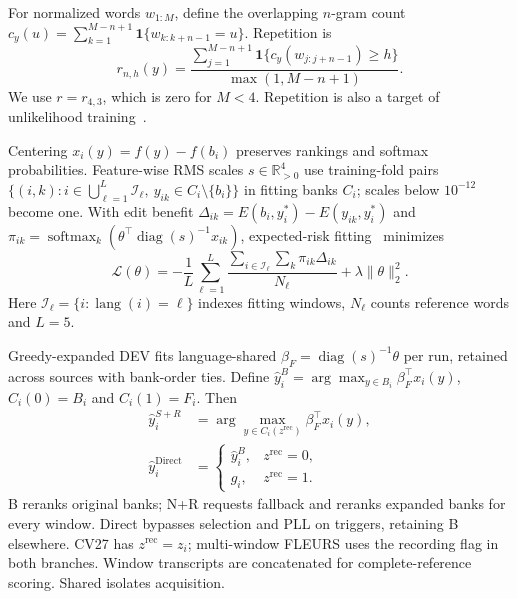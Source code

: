 \documentclass[conference,letterpaper]{IEEEtran}
\begin{document}
For normalized words $w_{1:M}$, define the overlapping $n$-gram count $c_y(u)=\sum_{k=1}^{M-n+1}\mathbf1\{w_{k:k+n-1}=u\}$. Repetition is
\begin{equation}
r_{n,h}(y)=\frac{\sum_{j=1}^{M-n+1}\mathbf1\{c_y(w_{j:j+n-1})\ge h\}}{\max(1,M-n+1)}.
\label{eq:repetition}
\end{equation}
We use $r=r_{4,3}$, which is zero for $M<4$. Repetition is also a target of unlikelihood training~\cite{welleck2020}.

Centering $x_i(y)=f(y)-f(b_i)$ preserves rankings and softmax probabilities. Feature-wise RMS scales $s\in\mathbb R^4_{>0}$ use training-fold pairs $\{(i,k):i\in\bigcup_{\ell=1}^L\mathcal I_\ell,\ y_{ik}\in C_i\setminus\{b_i\}\}$ in fitting banks $C_i$; scales below $10^{-12}$ become one. With edit benefit $\Delta_{ik}=E(b_i,y_i^*)-E(y_{ik},y_i^*)$ and $\pi_{ik}=\operatorname{softmax}_k\!\left(\theta^\top\operatorname{diag}(s)^{-1}x_{ik}\right)$, expected-risk fitting~\cite{mwer2018} minimizes
\begin{equation}
\mathcal L(\theta)=-\frac1L\sum_{\ell=1}^L\frac{\sum_{i\in\mathcal I_\ell}\sum_k\pi_{ik}\Delta_{ik}}{N_\ell}+\lambda\|\theta\|_2^2.
\label{eq:risk}
\end{equation}
Here $\mathcal I_\ell=\{i:\operatorname{lang}(i)=\ell\}$ indexes fitting windows, $N_\ell$ counts reference words and $L=5$.
\par\newpage\setlength{\parskip}{0pt plus 4pt}\noindent
Greedy-expanded DEV fits language-shared $\beta_F=\operatorname{diag}(s)^{-1}\theta$ per run, retained across sources with bank-order ties. Define $\hat{y}_i^B=\arg\max_{y\in B_i}\beta_F^\top x_i(y)$, $C_i(0)=B_i$ and $C_i(1)=F_i$. Then
\begin{equation}
\begin{aligned}
\hat{y}_i^{S+R}&=\arg\max_{y\in C_i(z^{\mathrm{rec}})}\beta_F^\top x_i(y),\\
\hat{y}_i^{\mathrm{Direct}}&=\begin{cases}\hat{y}_i^B,&z^{\mathrm{rec}}=0,\\g_i,&z^{\mathrm{rec}}=1.\end{cases}
\end{aligned}\label{eq:accept}
\end{equation}
B reranks original banks; N+R requests fallback and reranks expanded banks for every window. Direct bypasses selection and PLL on triggers, retaining B elsewhere. CV27 has $z^{\mathrm{rec}}=z_i$; multi-window FLEURS uses the recording flag in both branches. Window transcripts are concatenated for complete-reference scoring. Shared isolates acquisition.
\end{document}
